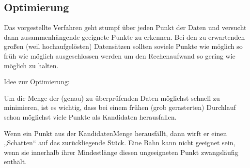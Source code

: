 \documentclass[
11pt, %
a4paper, %
oneside, %
pdfspacing, %
headinclude,
BCOR5mm, %
ngerman, %
bibtotocnumbered,
]{scrartcl}
\begin{document}
\subsection{Optimierung}

Das vorgestellte Verfahren geht stumpf über jeden Punkt der Daten und versucht dann zusammenhängende geeignete Punkte zu erkennen. Bei den zu erwartenden großen (weil hochaufgelösten) Datensätzen sollten soviele Punkte wie möglich so früh wie möglich ausgeschlossen werden um den Rechenaufwand so gering wie möglich zu halten.

Idee zur Optimierung:

Um die Menge der (genau) zu überprüfenden Daten möglichst schnell zu minimieren, ist es wichtig, dass bei einem frühen (grob gerasterten) Durchlauf schon möglichst viele Punkte als Kandidaten herausfallen.

Wenn ein Punkt aus der KandidatenMenge herausfällt, dann wirft er einen „Schatten“ auf das zurückliegende Stück. Eine Bahn kann nicht geeignet sein, wenn sie innerhalb ihrer Mindestlänge diesen ungeeigneten Punkt zwangsläufig enthält.
\end{document}
